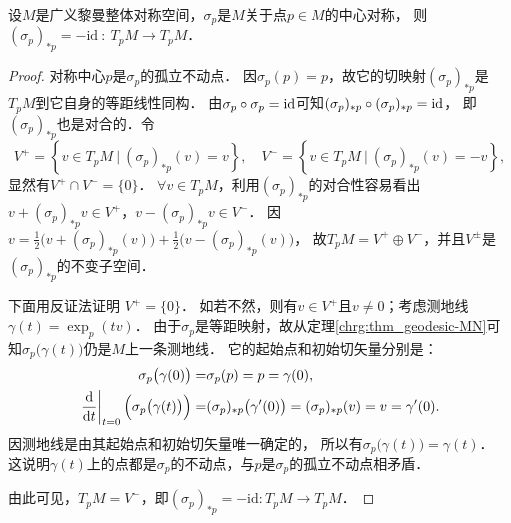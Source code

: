 \begin{theorem}\label{chhss:thm_sss}
设$M$是广义黎曼整体对称空间，$\sigma_p$是$M$关于点$p\in M$的中心对称，
则$(\sigma_p)_{*p}=-\mathrm{id}\ :\  T_p M \rightarrow T_p M $．
\end{theorem}
\begin{proof}
对称中心$p$是$\sigma_p$的孤立不动点．
因$\sigma_p(p)=p$，故它的切映射$(\sigma_p)_{* p} $是$T_p M$到它自身的等距线性同构．
由$\sigma_p \circ \sigma_p= {\rm id} $可知$(\sigma_p)_{* p} \circ (\sigma_p)_{* p}= {\rm id}$，
即$(\sigma_p)_{* p}$也是对合的．令
\begin{equation*}
    V^{+}=\left\{v \in T_p M \ | \ \left(\sigma_p\right)_{* p}(v)=v\right\}, \quad
    V^{-}=\left\{v \in T_p M \ | \ \left(\sigma_p\right)_{* p}(v)=-v\right\},
\end{equation*}
显然有$V^+ \cap V^- =\{0\}$．
$\forall v\in T_p M$，利用$(\sigma_p)_{* p}$的对合性容易看出
$ v+ (\sigma_p)_{* p} v \in V^{+}$，$v- (\sigma_p)_{* p} v \in V^{-} $．
因$v=\frac{1}{2}\bigl(v+(\sigma_p)_{*p}(v)\bigr)+\frac{1}{2}\bigl(v-(\sigma_p)_{*p} (v)\bigr)$，
故$T_p M=V^{+} \oplus V^{-}$，并且$V^{\pm}$是$(\sigma_p)_{* p}$的不变子空间．

下面用反证法证明 $V^{+}=\{0\}$．
如若不然，则有$v\in V^+$且$v\neq 0$；考虑测地线$\gamma(t)=\exp_p(t v)$．
由于$\sigma_p$是等距映射，故从定理\ref{chrg:thm_geodesic-MN}可
知$\sigma_p\bigl(\gamma(t)\bigr)$仍是$M$上一条测地线．
它的起始点和初始切矢量分别是：
\begin{align*}
    \sigma_p\bigl(\gamma(0)\bigr)=& \sigma_p(p)=p=\gamma(0), \\
    \left.\frac{\mathrm{d}}{\mathrm{d} t}\right|_{t=0}\Bigl(\sigma_p\bigl(\gamma(t)\bigr)\Bigr)=&
    (\sigma_p)_{* p}\bigl(\gamma^{\prime}(0)\bigr)=(\sigma_p)_{* p}(v)=v=\gamma^{\prime}(0) .
\end{align*}
因测地线是由其起始点和初始切矢量唯一确定的，
所以有$\sigma_p\bigl(\gamma(t)\bigr)=\gamma(t)$．
这说明$\gamma(t)$上的点都是$\sigma_p$的不动点，与$p$是$\sigma_p$的孤立不动点相矛盾．

由此可见，$T_p M=V^-$，即$(\sigma_p)_{*p} =-\mathrm{id}: T_p M \rightarrow T_p M$．
\end{proof}


